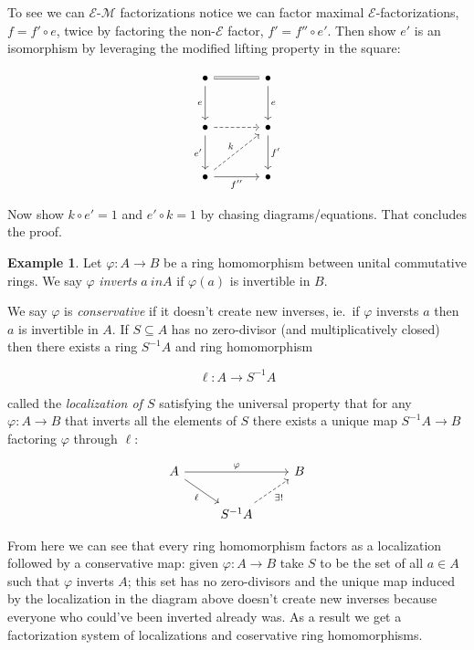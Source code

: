 \documentclass[11pt]{amsart}
\theoremstyle{plain}
\theoremstyle{definition}
\newtheorem*{eg*}{Example}
\newcommand{\cE}{{\mathcal E}}
\newcommand{\cM}{{\mathcal M}}
\newcommand{\noi}{{\noindent}}
\begin{document}
To see we can $\cE$-$\cM$ factorizations notice we can factor maximal $\cE$-factorizations, $f = f' \circ e$, twice by factoring the non-$\cE$ factor, $f' = f'' \circ e'$. Then show $e'$ is an isomorphism by leveraging the modified lifting property in the square: 

\[\begin{tikzcd}[column sep = large, row sep = large]
	\bullet & \bullet \\
	\bullet & \bullet \\
	\bullet & \bullet
	\arrow["e"', from=1-1, to=2-1]
	\arrow["{e'}"', from=2-1, to=3-1]
	\arrow["k", dashed, from=3-1, to=2-2]
	\arrow[equals, "", from=1-1, to=1-2]
	\arrow["e", from=1-2, to=2-2]
	\arrow["{f'}", from=2-2, to=3-2]
	\arrow["{f''}"', from=3-1, to=3-2]
	\arrow[dashed, from=2-1, to=2-2]
\end{tikzcd}\]

\noi Now show $k \circ e' =1$ and $e' \circ k = 1$ by chasing diagrams/equations. That concludes the proof. \bigskip 

\begin{eg*}
Let $\varphi : A \to B$ be a ring homomorphism between unital commutative rings. We say $\varphi$ \textit{inverts} $a \ in A$ if $\varphi(a)$ is invertible in $B$. \medskip 

We say $\varphi$ is \textit{conservative} if it doesn't create new inverses, ie.~if $\varphi$ inversts $a$ then $a$ is invertible in $A$. If $S \subseteq A$ has no zero-divisor (and multiplicatively closed) then there exists a ring $S^{-1} A$ and ring homomorphism 

\[ \ell : A \to S^{-1} A\]

\noi called the \textit{localization of $S$} satisfying the universal property that for any $\varphi : A \to B$ that inverts all the elements of $S$ there exists a unique map $S^{-1} A \to B$ factoring $\varphi$ through $\ell$: 

\[ \begin{tikzcd}
  A \ar[dr, "\ell"'] \rar[rr, "\varphi"] && B \\
  & S^{-1}A \ar[ur, dashed, "\exists !"']
\end{tikzcd}\]

\noi From here we can see that every ring homomorphism factors as a localization followed by a conservative map: given $\varphi : A \to B$ take $S$ to be the set of all $a \in A$ such that $\varphi$ inverts $A$; this set has no zero-divisors and the unique map induced by the localization in the diagram above doesn't create new inverses because everyone who could've been inverted already was. As a result we get a factorization system of localizations and coservative ring homomorphisms. 
\end{eg*}
\end{document}
